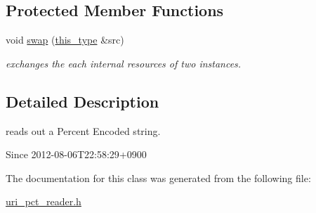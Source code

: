 \subsection*{Protected Member Functions}
\begin{DoxyCompactItemize}
\item 
\hypertarget{classhryky_1_1uri_1_1pct_1_1_reader_af81412fb5ea8487ca84534ffdfdf892d}{void \hyperlink{classhryky_1_1uri_1_1pct_1_1_reader_af81412fb5ea8487ca84534ffdfdf892d}{swap} (\hyperlink{classhryky_1_1uri_1_1pct_1_1_reader_a3b7a7d66f38f342ae28d4200727cdff1}{this\-\_\-type} \&src)}\label{classhryky_1_1uri_1_1pct_1_1_reader_af81412fb5ea8487ca84534ffdfdf892d}

\begin{DoxyCompactList}\small\item\em exchanges the each internal resources of two instances. \end{DoxyCompactList}\end{DoxyCompactItemize}


\subsection{Detailed Description}
reads out a Percent Encoded string. 

\begin{DoxySince}{Since}
2012-\/08-\/06\-T22\-:58\-:29+0900 
\end{DoxySince}


The documentation for this class was generated from the following file\-:\begin{DoxyCompactItemize}
\item 
\hyperlink{uri__pct__reader_8h}{uri\-\_\-pct\-\_\-reader.\-h}\end{DoxyCompactItemize}
